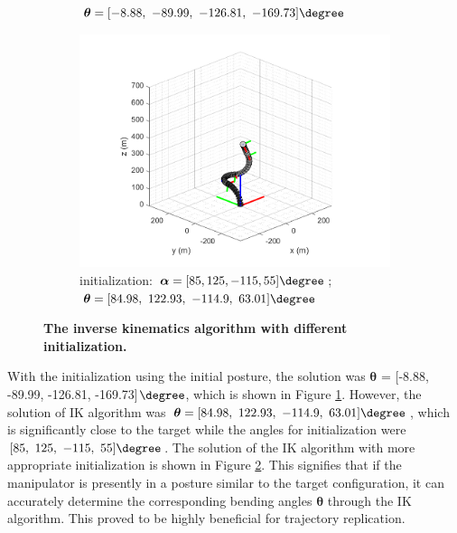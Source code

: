\begin{figure}[H]
\begin{subfigure}{0.49\textwidth}
{        $\boldsymbol{\theta} = [-8.88,\ -89.99,\ -126.81,\ -169.73]\degree$ }
        \label{fig:complex_init_0_0_0_0}
    \end{subfigure}
    \begin{subfigure}{0.49\textwidth} %
        \centering
        \includegraphics[width=\linewidth]{Image/MATLAB/manipulator_84.98_122.93_-114.9_63.01.png}
        \caption{\centering initialization: $\boldsymbol{\alpha} = [85, 125, -115, 55]\degree$; \\
        $\boldsymbol{\theta} = [84.98,\ 122.93,\ -114.9,\ 63.01]\degree$ }
        \label{fig:complex_init_85_125_-115_55}
    \end{subfigure}
    \caption[The kinematics model of manipulator with respective bending modules]
    {\centering \textbf{The inverse kinematics algorithm with different initialization.}}
    \label{fig:80_120_-120_90_diff_initial}
\end{figure}
\vspace{-5mm}
With the initialization using the initial posture, the solution was $\boldsymbol{\theta}$ = 
[-8.88, -89.99, -126.81, -169.73]$\degree$, which is shown in Figure \ref{fig:complex_init_0_0_0_0}. 
However, the solution of IK algorithm was $\boldsymbol{\theta} = [84.98,\ 122.93,\ -114.9,\ 63.01]\degree$, 
which is significantly close to the target while the angles for initialization were $[85,\ 125,\ -115,\ 55]\degree$. 
The solution of the IK algorithm with more appropriate initialization is shown in Figure 
\ref{fig:complex_init_85_125_-115_55}. This signifies that if the manipulator is presently in a posture similar 
to the target configuration, it can accurately determine the corresponding bending angles $\boldsymbol{\theta}$ through the 
IK algorithm. This proved to be highly beneficial for trajectory replication.

